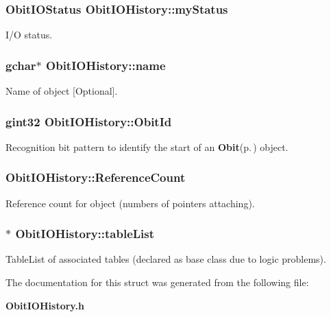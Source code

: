 \subsubsection{\setlength{\rightskip}{0pt plus 5cm}Obit\-IOStatus {\bf Obit\-IOHistory::my\-Status}}\label{structObitIOHistory_o5}


I/O status. 

\subsubsection{\setlength{\rightskip}{0pt plus 5cm}gchar$\ast$ {\bf Obit\-IOHistory::name}}\label{structObitIOHistory_o3}


Name of object [Optional]. 

\subsubsection{\setlength{\rightskip}{0pt plus 5cm}gint32 {\bf Obit\-IOHistory::Obit\-Id}}\label{structObitIOHistory_o0}


Recognition bit pattern to identify the start of an {\bf Obit}{\rm (p.\,\pageref{structObit})} object. 

\subsubsection{ {\bf Obit\-IOHistory::Reference\-Count}}\label{structObitIOHistory_o2}


Reference count for object (numbers of pointers attaching). 

\subsubsection{$\ast$ {\bf Obit\-IOHistory::table\-List}}\label{structObitIOHistory_o9}


Table\-List of associated tables (declared as base class due to logic problems). 



The documentation for this struct was generated from the following file:\begin{CompactItemize}
\item 
{\bf Obit\-IOHistory.h}\end{CompactItemize}
